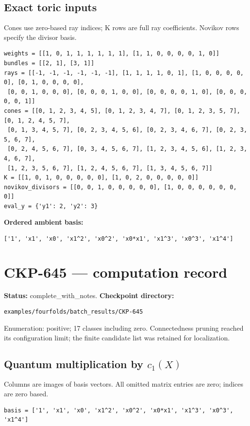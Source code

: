 \documentclass[10pt,a4paper]{article}
\begin{document}
\subsection*{Exact toric inputs}
Cones use zero-based ray indices; K rows are full ray coefficients. Novikov rows specify the divisor basis.

\begin{lstlisting}
weights = [[1, 0, 1, 1, 1, 1, 1, 1], [1, 1, 0, 0, 0, 0, 1, 0]]
bundles = [[2, 1], [3, 1]]
rays = [[-1, -1, -1, -1, -1, -1], [1, 1, 1, 1, 0, 1], [1, 0, 0, 0, 0, 0], [0, 1, 0, 0, 0, 0],
 [0, 0, 1, 0, 0, 0], [0, 0, 0, 1, 0, 0], [0, 0, 0, 0, 1, 0], [0, 0, 0, 0, 0, 1]]
cones = [[0, 1, 2, 3, 4, 5], [0, 1, 2, 3, 4, 7], [0, 1, 2, 3, 5, 7], [0, 1, 2, 4, 5, 7],
 [0, 1, 3, 4, 5, 7], [0, 2, 3, 4, 5, 6], [0, 2, 3, 4, 6, 7], [0, 2, 3, 5, 6, 7],
 [0, 2, 4, 5, 6, 7], [0, 3, 4, 5, 6, 7], [1, 2, 3, 4, 5, 6], [1, 2, 3, 4, 6, 7],
 [1, 2, 3, 5, 6, 7], [1, 2, 4, 5, 6, 7], [1, 3, 4, 5, 6, 7]]
K = [[1, 0, 1, 0, 0, 0, 0, 0], [1, 0, 2, 0, 0, 0, 0, 0]]
novikov_divisors = [[0, 0, 1, 0, 0, 0, 0, 0], [1, 0, 0, 0, 0, 0, 0, 0]]
eval_y = {'y1': 2, 'y2': 3}
\end{lstlisting}

\textbf{Ordered ambient basis:}
\begin{lstlisting}
['1', 'x1', 'x0', 'x1^2', 'x0^2', 'x0*x1', 'x1^3', 'x0^3', 'x1^4']
\end{lstlisting}

\clearpage\section*{CKP-645 --- computation record}
\textbf{Status:} complete\_with\_notes.
\textbf{Checkpoint directory:}
\begin{lstlisting}
examples/fourfolds/batch_results/CKP-645
\end{lstlisting}

Enumeration: positive; 17 classes including zero.
Connectedness pruning reached its configuration limit; the finite candidate list was retained for localization.
\subsection*{Quantum multiplication by $c_1(X)$}
Columns are images of basis vectors. All omitted matrix entries are zero; indices are zero based.

\begin{lstlisting}
basis = ['1', 'x1', 'x0', 'x1^2', 'x0^2', 'x0*x1', 'x1^3', 'x0^3', 'x1^4']
\end{lstlisting}
\end{document}
